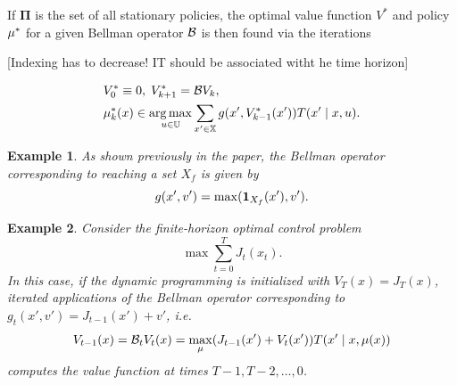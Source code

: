 \documentclass[conference]{IEEEtran}
\newtheorem{example}{Example}
\newcommand{\red}[1]{{\color{red} #1 }}
\begin{document}
If $\mathbf{\Pi}$ is the set of all stationary policies, the optimal value function $V^*$ and policy $\mu^*$ for a given Bellman operator $\mathcal{B}$ is then found via the iterations

\red{[Indexing has to decrease! IT should be associated witht he time horizon]}

\begin{subequations}
\label{eq:value_iter}
  \begin{align}
    & V^*_0 \equiv 0, \; V^*_{k+1}  = \bellman V_k \label{eq:iter}, \\
    & \pol_k^*(x) \in \argmax_{u \in \U} \sum_{x' \in \X}  g(x', V_{k-1}^*(x')) T(x' \mid x, u).
  \end{align}
\end{subequations}

\begin{example}
  As shown previously in the paper, the Bellman operator corresponding to reaching a set $X_f$ is given by
  \begin{equation}
  \label{eq:bellman_reach}
    g(x', v') = \max( \ind_{X_f}(x'), v').
  \end{equation}
\end{example}

\begin{example}
  Consider the finite-horizon optimal control problem
  \begin{equation}
     \max \sum_{t=0}^T J_t(x_t).
  \end{equation}
  In this case, if the dynamic programming is initialized with $V_T(x) = J_T(x)$, iterated applications of the Bellman operator corresponding to $g_t(x', v') = J_{t-1}(x') + v'$, i.e.
  \begin{equation*}
    V_{t-1}(x) = \mathcal{B}_t V_{t} (x) = \max_{\mu} (J_{t-1}(x') + V_{t}(x')) T(x' \mid x, \mu(x))
  \end{equation*}
  computes the value function at times $T-1, T-2, \ldots, 0$.
\end{example}
\end{document}
